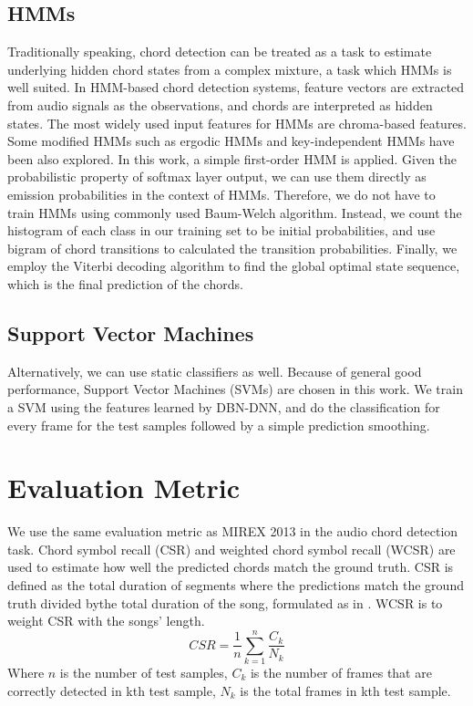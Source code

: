 \documentclass{article}
\begin{document}
\subsection{HMMs}
Traditionally speaking, chord detection can be treated as a task to estimate underlying hidden chord states from a complex mixture, a task which HMMs is well suited. In HMM-based chord detection systems, feature vectors are extracted from audio signals as the observations, and chords are interpreted as hidden states. The most widely used input features for HMMs are chroma-based features. Some modified HMMs such as ergodic HMMs and key-independent HMMs have been also explored. In this work, a simple first-order HMM is applied. Given the probabilistic property of softmax layer output, we can use them directly as emission probabilities in the context of HMMs. Therefore, we do not have to train HMMs using commonly used Baum-Welch algorithm. Instead, we count the histogram of each class in our training set to be initial probabilities, and use bigram of chord transitions to calculated the transition probabilities. Finally, we employ the Viterbi decoding algorithm to find the global optimal state sequence, which is the final prediction of the chords. 
\subsection{Support Vector Machines}
Alternatively, we can use static classifiers as well. Because of general good performance, Support Vector Machines (SVMs) are chosen in this work. We train a SVM using the features learned by DBN-DNN, and do the classification for every frame for the test samples followed by a simple prediction smoothing. 

\section{Evaluation Metric}
We use the same evaluation metric as MIREX 2013 in the audio chord detection task. Chord symbol recall (CSR) and weighted chord symbol recall (WCSR) are used to estimate how well the predicted chords match the ground truth. CSR is defined as the total duration of segments where the predictions match the ground truth divided bythe total duration of the song, formulated as in . WCSR is to weight CSR with the songs' length.  
\begin{equation}\label{csr}
CSR = \frac{1}{n} \sum_{k=1}^n \frac{C_{k}}{N_{k}}
\end{equation}
Where $n$ is the number of test samples, $C_{k}$ is the number of frames that are correctly detected in kth test sample, $N_{k}$ is the total frames in kth test sample. 
\end{document}
